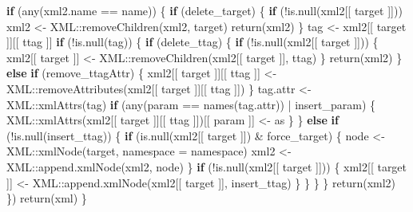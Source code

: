 \documentclass[
]{article}
\newenvironment{Shaded}{\begin{snugshade}}{\end{snugshade}}
\newcommand{\AttributeTok}[1]{\textcolor[rgb]{0.77,0.63,0.00}{#1}}
\newcommand{\ControlFlowTok}[1]{\textcolor[rgb]{0.13,0.29,0.53}{\textbf{#1}}}
\newcommand{\FunctionTok}[1]{\textcolor[rgb]{0.00,0.00,0.00}{#1}}
\newcommand{\NormalTok}[1]{#1}
\newcommand{\OtherTok}[1]{\textcolor[rgb]{0.56,0.35,0.01}{#1}}
\newcommand{\SpecialCharTok}[1]{\textcolor[rgb]{0.00,0.00,0.00}{#1}}
\begin{document}
\begin{Shaded}
\begin{Highlighting}[]
        \ControlFlowTok{if}\NormalTok{ (}\FunctionTok{any}\NormalTok{(xml2.name }\SpecialCharTok{==}\NormalTok{ name)) \{}
          \ControlFlowTok{if}\NormalTok{ (delete\_target) \{}
            \ControlFlowTok{if}\NormalTok{ (}\SpecialCharTok{!}\FunctionTok{is.null}\NormalTok{(xml2[[ target ]]))}
\NormalTok{              xml2 }\OtherTok{\textless{}{-}}\NormalTok{ XML}\SpecialCharTok{::}\FunctionTok{removeChildren}\NormalTok{(xml2, target)}
            \FunctionTok{return}\NormalTok{(xml2)}
\NormalTok{          \}}
\NormalTok{          tag }\OtherTok{\textless{}{-}}\NormalTok{ xml2[[ target ]][[ ttag ]]}
          \ControlFlowTok{if}\NormalTok{ (}\SpecialCharTok{!}\FunctionTok{is.null}\NormalTok{(tag)) \{}
            \ControlFlowTok{if}\NormalTok{ (delete\_ttag) \{}
              \ControlFlowTok{if}\NormalTok{ (}\SpecialCharTok{!}\FunctionTok{is.null}\NormalTok{(xml2[[ target ]])) \{}
\NormalTok{                xml2[[ target ]] }\OtherTok{\textless{}{-}}\NormalTok{ XML}\SpecialCharTok{::}\FunctionTok{removeChildren}\NormalTok{(xml2[[ target ]], ttag)}
\NormalTok{              \}}
              \FunctionTok{return}\NormalTok{(xml2)}
\NormalTok{            \} }\ControlFlowTok{else} \ControlFlowTok{if}\NormalTok{ (remove\_ttagAttr) \{}
\NormalTok{              xml2[[ target ]][[ ttag ]] }\OtherTok{\textless{}{-}}\NormalTok{ XML}\SpecialCharTok{::}\FunctionTok{removeAttributes}\NormalTok{(xml2[[ target ]][[ ttag ]])}
\NormalTok{            \}}
\NormalTok{            tag.attr }\OtherTok{\textless{}{-}}\NormalTok{ XML}\SpecialCharTok{::}\FunctionTok{xmlAttrs}\NormalTok{(tag)}
            \ControlFlowTok{if}\NormalTok{ (}\FunctionTok{any}\NormalTok{(param }\SpecialCharTok{==} \FunctionTok{names}\NormalTok{(tag.attr)) }\SpecialCharTok{|}\NormalTok{ insert\_param) \{}
\NormalTok{              XML}\SpecialCharTok{::}\FunctionTok{xmlAttrs}\NormalTok{(xml2[[ target ]][[ ttag ]])[[ param ]] }\OtherTok{\textless{}{-}}\NormalTok{ as}
\NormalTok{            \}}
\NormalTok{          \} }\ControlFlowTok{else} \ControlFlowTok{if}\NormalTok{ (}\SpecialCharTok{!}\FunctionTok{is.null}\NormalTok{(insert\_ttag)) \{}
            \ControlFlowTok{if}\NormalTok{ (}\FunctionTok{is.null}\NormalTok{(xml2[[ target ]]) }\SpecialCharTok{\&}\NormalTok{ force\_target) \{}
\NormalTok{              node }\OtherTok{\textless{}{-}}\NormalTok{ XML}\SpecialCharTok{::}\FunctionTok{xmlNode}\NormalTok{(target, }\AttributeTok{namespace =}\NormalTok{ namespace)}
\NormalTok{              xml2 }\OtherTok{\textless{}{-}}\NormalTok{ XML}\SpecialCharTok{::}\FunctionTok{append.xmlNode}\NormalTok{(xml2, node)}
\NormalTok{            \}}
            \ControlFlowTok{if}\NormalTok{ (}\SpecialCharTok{!}\FunctionTok{is.null}\NormalTok{(xml2[[ target ]])) \{}
\NormalTok{              xml2[[ target ]] }\OtherTok{\textless{}{-}}\NormalTok{ XML}\SpecialCharTok{::}\FunctionTok{append.xmlNode}\NormalTok{(xml2[[ target ]], insert\_ttag)}
\NormalTok{            \}}
\NormalTok{          \}}
\NormalTok{        \}}
\NormalTok{      \}}
      \FunctionTok{return}\NormalTok{(xml2)}
\NormalTok{    \})}
  \FunctionTok{return}\NormalTok{(xml)}
\NormalTok{\}}


\end{Highlighting}
\end{Shaded}
\end{document}
